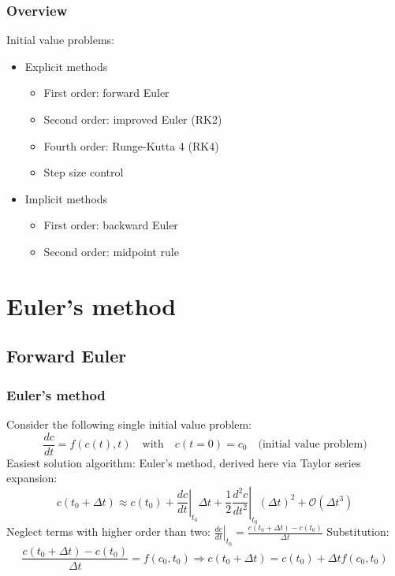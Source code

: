 \begin{frame}
  \frametitle{Overview}
  Initial value problems:
  \begin{itemize}
     \item Explicit methods
    \begin{itemize}
       \item First order: forward Euler
       \item Second order: improved Euler (RK2)
       \item Fourth order: Runge-Kutta 4 (RK4)
       \item Step size control
    \end{itemize}
     \item Implicit methods
    \begin{itemize}
       \item First order: backward Euler
       \item Second order: midpoint rule
    \end{itemize}
  \end{itemize}
\end{frame}

\section{Euler's method}
\subsection{Forward Euler}
\begin{frame}
  \frametitle{Euler's method}
  Consider the following single initial value problem:
  \[
    \frac{dc}{dt} = f(c(t),t) \quad \text{with} \quad c(t=0)=c_0 \quad \text{(initial value problem)}
  \]
  \pause
  Easiest solution algorithm: Euler's method, derived here via Taylor series expansion:
  \[
    c(t_0 + \Delta t) \approx c(t_0) + \left.\frac{dc}{dt}\right|_{t_0}\Delta t + \frac{1}{2} \left.\frac{d^2c}{dt^2}\right|_{t_0} \left(\Delta t\right) ^2 + \mathcal{O}{(\Delta t^3)}
  \]
  \pause
  Neglect terms with higher order than two: $\left. \frac{dc}{dt}\right|_{t_0} = \frac{c(t_0 + \Delta t) - c(t_0)}{\Delta t}$
  Substitution: 
  \[
    \frac{c(t_0 + \Delta t) - c(t_0)}{\Delta t} = f(c_0,t_0)\Rightarrow c(t_0+\Delta t) = c(t_0) + \Delta t f(c_0,t_0) 
  \]
\end{frame}

